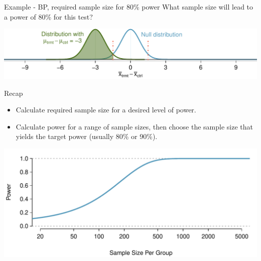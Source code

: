 \documentclass[
  ignorenonframetext,
]{beamer}
\begin{document}
\begin{frame}{Example - BP, required sample size for 80\% power}
\protect\hypertarget{example---bp-required-sample-size-for-80-power}{}
\alert{What sample size will lead to a power of 80\% for this test?}

\pause

\includegraphics[width=\textwidth,height=0.5\textheight]{power_null_0_0-76_with_alt_at_3_and_shaded.pdf}

\pause


\pause


\pause

\end{frame}

\begin{frame}{Recap}
\protect\hypertarget{recap}{}
\begin{itemize}
\item
  Calculate required sample size for a desired level of power.
\item
  Calculate power for a range of sample sizes, then choose the sample
  size that yields the target power (usually 80\% or 90\%).
\end{itemize}

\includegraphics[width=\textwidth,height=0.7\textheight]{power_curve_neg-3.pdf}
\end{frame}
\end{document}
